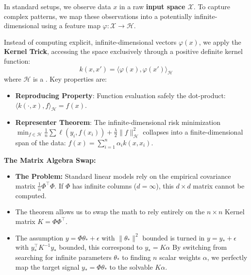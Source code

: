 \documentclass[
11pt,notheorems,hyperref={pdfauthor=whatever}
]{beamer}
\begin{document}
\begin{frame}
    In standard setups, we observe data \(x\) in a raw \alert{\textbf{input space \(\mathcal{X}\)}}. To capture complex patterns, we map these observations into a potentially infinite-dimensional  using a feature map \(\varphi: \mathcal{X} \rightarrow \mathcal{H}\).
    
    Instead of computing explicit, infinite-dimensional vectors \(\varphi(x)\), we apply the \alert{\textbf{Kernel Trick}}, accessing the space exclusively through a positive definite kernel function:
    \[
        k(x, x') = \langle \varphi(x), \varphi(x') \rangle_{\mathcal{H}}
    \]
    where \(\mathcal{H}\) is a . Key properties are:
    \begin{itemize}
        \item \alert{\textbf{Reproducing Property}}: Function evaluation safely the dot-product: \(\langle k(\cdot, x), f \rangle_{\mathcal{H}} = f(x)\).
        \item \alert{\textbf{Representer Theorem}}: The infinite-dimensional risk minimization \(\min_{f \in \mathcal{H}} \frac{1}{n} \sum \ell(y_i, f(x_i)) + \frac{\lambda}{2} \|f\|_{\mathcal{H}}^2\) collapses into a finite-dimensional span of the data: \(f(x) = \sum_{i=1}^n \alpha_i k(x, x_i)\).
    \end{itemize}

    \textbf{The Matrix Algebra Swap:}
    \begin{itemize}
        \item \alert{\textbf{The Problem:}} Standard linear models rely on the empirical covariance matrix \(\frac{1}{n}\Phi^\top\Phi\). If \(\Phi\) has infinite columns (\(d = \infty\)), this \(d \times d\) matrix cannot be computed.
        \item {} The theorem allows us to swap the math to rely entirely on the \(n \times n\) Kernel matrix \(K = \Phi\Phi^\top\). 
        \item The assumption \(y = \Phi\theta_* + \epsilon\) with \(\|\theta_*\|^2\) bounded is turned in \(y = y_* + \epsilon\) with \(y_*^\top K^{-1}y_*\) bounded, this correspond to \(y_* = K\alpha\)
        By switching from searching for infinite parameters \(\theta_*\) to finding \(n\) scalar weights \(\alpha\), we perfectly map the target signal \(y_* = \Phi\theta_*\) to the solvable \(K\alpha\).
    \end{itemize}
\end{frame}
\end{document}
